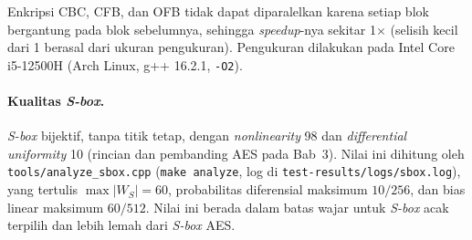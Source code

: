 Enkripsi CBC, CFB, dan OFB tidak dapat diparalelkan karena setiap blok bergantung pada blok
sebelumnya, sehingga \textit{speedup}-nya sekitar 1$\times$ (selisih kecil dari 1 berasal dari
ukuran pengukuran). Pengukuran dilakukan pada Intel Core i5-12500H
(Arch Linux, g++ 16.2.1, \texttt{-O2}).

\paragraph{Kualitas \textit{S-box}.} \textit{S-box} bijektif, tanpa titik tetap, dengan
\textit{nonlinearity} 98 dan \textit{differential uniformity} 10 (rincian dan pembanding AES pada
Bab~3). Nilai ini dihitung oleh \texttt{tools/analyze\_sbox.cpp} (\texttt{make analyze}, log di
\texttt{test-results/logs/sbox.log}), yang tertulis $\max|W_S| = 60$, probabilitas
diferensial maksimum $10/256$, dan bias linear maksimum $60/512$. 
Nilai ini berada dalam batas wajar untuk \textit{S-box} acak terpilih
dan lebih lemah dari \textit{S-box} AES. 
